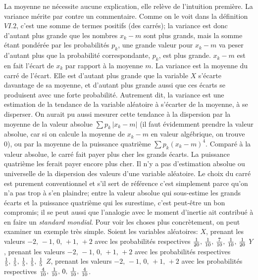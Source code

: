 La moyenne ne n\'ecessite aucune explication, elle rel\`eve de l'intuition
premi\`ere. La variance m\'erite par contre un commentaire. Comme on le 
voit dans la d\'efinition $VI.2$, c'est une somme de termes positifs (des
carr\'es); la variance est donc d'autant plus grande que les nombres $x_k -
m$ sont plus grands, mais la somme \'etant pond\'er\'ee par les
probabilit\'es  $p_k$, une grande valeur pour $x_k - m$ va peser d'autant
plus que la probabilit\'e correspondante, $p_k$, est plus grande. $x_k - m$
est en fait l'\'ecart de $x_k$ par rapport \`a la moyenne $m$. La variance
est la moyenne du carr\'e de l'\'ecart. Elle est d'autant plus grande que la
variable $X$ s'\'ecarte davantage de sa moyenne, et d'autant plus grande
aussi que ces \'ecarts se produisent avec une forte probabilit\'e.
Autrement dit, la variance est une estimation de la tendance de la variable
al\'eatoire \`a s'\'ecarter de la moyenne, \`a se disperser. On aurait pu
aussi mesurer cette tendance \`a  la dispersion par la moyenne de la valeur
absolue $\sum p_k\, | x_k - m |$ (il faut \'evidemment prendre la valeur
absolue, car si on calcule la moyenne de $x_k - m$ en valeur alg\'ebrique,
on trouve 0), ou par la moyenne de la puissance quatri\`eme $\sum p_k (x_k
- m)^4$. Compar\'e \`a la valeur absolue, le carr\'e fait payer plus cher les
grands \'ecarts. La puissance quatri\`eme les ferait payer encore plus cher.
Il n'y a pas d'estimation absolue ou universelle de la dispersion des valeurs
d'une variable al\'eatoire. Le choix du carr\'e est purement conventionnel et
s'il sert de r\'ef\'erence c'est simplement parce qu'on n'a pas trop \`a s'en
plaindre; entre la valeur absolue qui sous-estime les grands \'ecarts et la
puissance quatri\`eme qui les surestime, c'est peut-\^etre un bon
compromis; il se peut aussi que l'analogie avec le moment d'inertie ait
contribu\'e \`a en faire un {\it standard mondial}. Pour voir les choses plus
concr\`etement, on peut examiner un exemple tr\`es simple. 
\medskip 
Soient les variables al\'eatoires:
\smallskip
$X$, prenant les valeurs $-2, \, -1, \, 0, \, +1,  \, +2$ avec les 
probabilit\'es respectives ${1 \over 20}, \, {1 \over 10}, \, {7 \over 10}, 
\, {1 \over  10}, \, {1 \over 20}$
\smallskip
$Y$, prenant les valeurs $-2, \, -1, \, 0, \, +1,  \, +2$ avec les 
probabilit\'es respectives ${1 \over 5}, \, {1 \over 5}, \, {1 \over 5}, \, {1
\over  5}, \, {1 \over 5}$
\smallskip
$Z$, prenant les valeurs $-2, \, -1, \, 0, \, +1,  \, +2$ avec les 
probabilit\'es respectives ${4 \over 10}, \, {1 \over 10}, \, {0}, \, {1 \over 
10}, \, {4 \over 10}$.
\medskip
